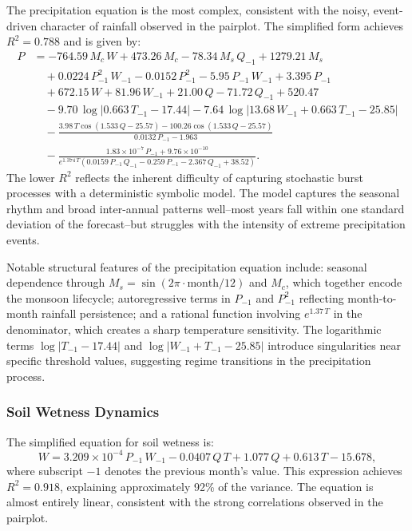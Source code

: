 \documentclass{article}
\begin{document}
The precipitation equation is the most complex, consistent with the noisy, event-driven character of rainfall observed in the pairplot. The simplified form achieves $R^2 = 0.788$ and is given by:
\begin{equation}
\begin{aligned}
P &= -764.59\, M_c\, W + 473.26\, M_c - 78.34\, M_s\, Q_{-1} + 1279.21\, M_s \\
  &\quad + 0.0224\, P_{-1}^2\, W_{-1} - 0.0152\, P_{-1}^2 - 5.95\, P_{-1}\, W_{-1} + 3.395\, P_{-1} \\
  &\quad + 672.15\, W + 81.96\, W_{-1} + 21.00\, Q - 71.72\, Q_{-1} + 520.47 \\
  &\quad - 9.70\, \log\left| 0.663\, T_{-1} - 17.44 \right| - 7.64\, \log\left| 13.68\, W_{-1} + 0.663\, T_{-1} - 25.85 \right| \\
  &\quad - \frac{3.98\, T \cos(1.533\, Q - 25.57) - 100.26 \cos(1.533\, Q - 25.57)}{0.0132\, P_{-1} - 1.963} \\
  &\quad - \frac{1.83 \times 10^{-7}\, P_{-1} + 9.76 \times 10^{-10}}{e^{1.374\, T} (0.0159\, P_{-1}\, Q_{-1} - 0.259\, P_{-1} - 2.367\, Q_{-1} + 38.52)}.
\end{aligned}
\label{eq:P}
\end{equation}
The lower $R^2$ reflects the inherent difficulty of capturing stochastic burst processes with a deterministic symbolic model. The model captures the seasonal rhythm and broad inter-annual patterns well--most years fall within one standard deviation of the forecast--but struggles with the intensity of extreme precipitation events.

Notable structural features of the precipitation equation include: seasonal dependence through $M_s = \sin(2\pi \cdot \text{month}/12)$ and $M_c$, which together encode the monsoon lifecycle; autoregressive terms in $P_{-1}$ and $P_{-1}^2$ reflecting month-to-month rainfall persistence; and a rational function involving $e^{1.37\, T}$ in the denominator, which creates a sharp temperature sensitivity. The logarithmic terms $\log|T_{-1} - 17.44|$ and $\log|W_{-1} + T_{-1} - 25.85|$ introduce singularities near specific threshold values, suggesting regime transitions in the precipitation process.

\subsubsection{Soil Wetness Dynamics}

The simplified equation for soil wetness is:
\begin{equation}
W = 3.209 \times 10^{-4}\, P_{-1}\, W_{-1} - 0.0407\, Q\, T + 1.077\, Q + 0.613\, T - 15.678,
\label{eq:SW}
\end{equation}
where subscript $-1$ denotes the previous month's value. This expression achieves $R^2 = 0.918$, explaining approximately 92\% of the variance. The equation is almost entirely linear, consistent with the strong correlations observed in the pairplot. 
\end{document}
